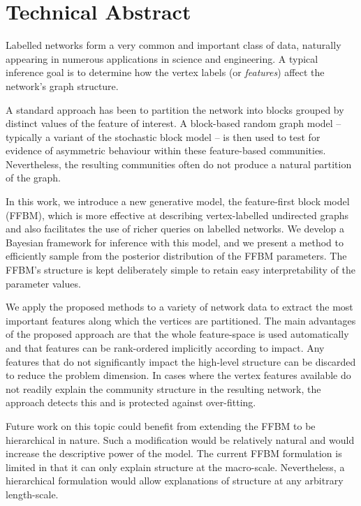 \section*{Technical Abstract}
Labelled networks form a very common and important class of data,
naturally appearing in numerous applications in science and engineering.
A typical inference goal is to determine how the vertex labels
(or {\em features}) affect the network's graph structure.

A standard approach has been to partition the network into blocks grouped
by distinct values of the feature of interest. A block-based random
graph model -- typically a variant of the stochastic block model --
is then used to test for evidence of asymmetric behaviour within these
feature-based communities. Nevertheless, the resulting communities
often do not produce a natural partition of the graph.

In this work, we introduce a new generative model, the feature-first block model (FFBM),
which is more effective at describing vertex-labelled undirected
graphs and also facilitates the use of richer queries on labelled networks.
We develop a Bayesian framework for inference with this model,
and we present a method to efficiently sample from the posterior
distribution of the FFBM parameters. The FFBM's structure is kept
deliberately simple to retain easy interpretability of the parameter
values.

We apply the proposed methods to a variety of network data
to extract the most important features along which the vertices
are partitioned. The main advantages of the proposed approach are
that the whole feature-space is used automatically and that features
can be rank-ordered implicitly according to impact. Any features
that do not significantly impact the high-level structure can be
discarded to reduce the problem dimension. In cases where the vertex
features available do not readily explain the community structure
in the resulting network, the approach detects this and is protected
against over-fitting.

Future work on this topic could benefit from extending the FFBM to be hierarchical in nature. Such a modification would be relatively natural and would increase the descriptive power of the model. The current FFBM formulation is limited in that it can only explain structure at the macro-scale. Nevertheless, a hierarchical formulation would allow explanations of structure at any arbitrary length-scale.